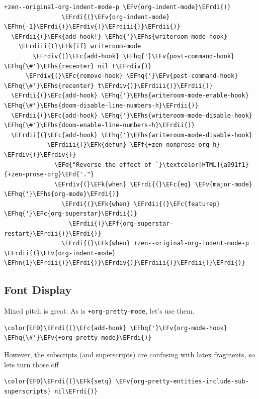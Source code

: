 \documentclass{scrartcl}
\newcommand{\EFk}[1]{\textcolor{EFk}{#1}} %
\newcommand{\EFd}[1]{\textcolor{EFd}{#1}} %
\newcommand{\EFc}[1]{\textcolor{EFc}{#1}} %
\newcommand{\EFv}[1]{\textcolor{EFv}{#1}} %
\newcommand{\EFf}[1]{\textcolor{EFf}{#1}} %
\newcommand{\EFhn}[1]{#1} %
\newcommand{\EFhq}[1]{#1} %
\newcommand{\EFhs}[1]{#1} %
\newcommand{\EFrdi}[1]{#1} %
\newcommand{\EFrdii}[1]{#1} %
\newcommand{\EFrdiii}[1]{#1} %
\newcommand{\EFrdiv}[1]{#1} %
\begin{document}
\begin{Code}
\begin{Verbatim}[]
                 +zen--original-org-indent-mode-p \EFv{org-indent-mode}\EFrdi{)}
                \EFrdi{(}\EFv{org-indent-mode} \EFhn{-1}\EFrdi{)}\EFrdiv{)}\EFrdiii{)}\EFrdii{)}
  \EFrdii{(}\EFk{add-hook!} \EFhq{'}\EFhs{writeroom-mode-hook}
    \EFrdiii{(}\EFk{if} writeroom-mode
        \EFrdiv{(}\EFc{add-hook} \EFhq{'}\EFv{post-command-hook} \EFhq{\#'}\EFhs{recenter} nil t\EFrdiv{)}
      \EFrdiv{(}\EFc{remove-hook} \EFhq{'}\EFv{post-command-hook} \EFhq{\#'}\EFhs{recenter} t\EFrdiv{)}\EFrdiii{)}\EFrdii{)}
  \EFrdii{(}\EFc{add-hook} \EFhq{'}\EFhs{writeroom-mode-enable-hook} \EFhq{\#'}\EFhs{doom-disable-line-numbers-h}\EFrdii{)}
  \EFrdii{(}\EFc{add-hook} \EFhq{'}\EFhs{writeroom-mode-disable-hook} \EFhq{\#'}\EFhs{doom-enable-line-numbers-h}\EFrdii{)}
  \EFrdii{(}\EFc{add-hook} \EFhq{'}\EFhs{writeroom-mode-disable-hook}
            \EFrdiii{(}\EFk{defun} \EFf{+zen-nonprose-org-h} \EFrdiv{(}\EFrdiv{)}
              \EFd{"Reverse the effect of `}\textcolor[HTML]{a991f1}{+zen-prose-org}\EFd{'."}
              \EFrdiv{(}\EFk{when} \EFrdi{(}\EFc{eq} \EFv{major-mode} \EFhq{'}\EFhs{org-mode}\EFrdi{)}
                \EFrdi{(}\EFk{when} \EFrdii{(}\EFc{featurep} \EFhq{'}\EFc{org-superstar}\EFrdii{)}
                  \EFrdii{(}\EFf{org-superstar-restart}\EFrdii{)}\EFrdi{)}
                \EFrdi{(}\EFk{when} +zen--original-org-indent-mode-p \EFrdii{(}\EFv{org-indent-mode} \EFhn{1}\EFrdii{)}\EFrdi{)}\EFrdiv{)}\EFrdiii{)}\EFrdii{)}\EFrdi{)}
\end{Verbatim}
\end{Code}

\subsection{Font Display}
\label{sec:org75ac024}
Mixed pitch is great. As is \texttt{+org-pretty-mode}, let's use them.
\begin{Code}
\begin{Verbatim}[]
\color{EFD}\EFrdi{(}\EFc{add-hook} \EFhq{'}\EFv{org-mode-hook} \EFhq{\#'}\EFv{+org-pretty-mode}\EFrdi{)}
\end{Verbatim}
\end{Code}

However, the subscripts (and superscripts) are confusing with latex fragments,
so lets turn those off
\begin{Code}
\begin{Verbatim}[]
\color{EFD}\EFrdi{(}\EFk{setq} \EFv{org-pretty-entities-include-sub-superscripts} nil\EFrdi{)}
\end{Verbatim}
\end{Code}
\end{document}
